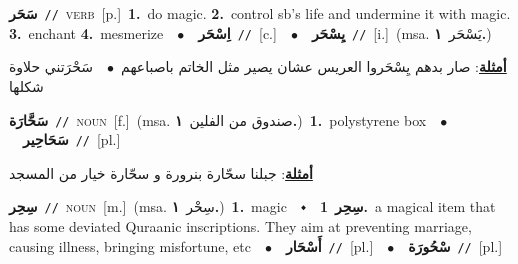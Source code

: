 \documentclass[10pt,a4paper,twoside]{article} %
\begin{document}
\begin{multicols}{2}
{\setlength\topsep{0pt}\textbf{\foreignlanguage{arabic}{سَحَر}}\ {\color{gray}\texttt{//}\color{black}}\ \textsc{verb}\ [p.]\ \textbf{1.}~do magic.  \textbf{2.}~control sb's life and undermine it with magic.  \textbf{3.}~enchant  \textbf{4.}~mesmerize\ \ $\bullet$\ \ \setlength\topsep{0pt}\textbf{\foreignlanguage{arabic}{اِسْحَر}}\ {\color{gray}\texttt{//}\color{black}}\ [c.]\ \ $\bullet$\ \ \setlength\topsep{0pt}\textbf{\foreignlanguage{arabic}{يِسْحَر}}\ {\color{gray}\texttt{//}\color{black}}\ [i.]\ \color{gray}(msa. \foreignlanguage{arabic}{يَسْحَر}~\foreignlanguage{arabic}{\textbf{١.}})\color{black}\  \begin{flushright}\color{gray}\foreignlanguage{arabic}{\textbf{\underline{\foreignlanguage{arabic}{أمثلة}}}: صار بدهم يِسْحَروا العريس عشان يصير مثل الخاتم باصباعهم\ $\bullet$\ \  سَحْرَتني حلاوة شكلها}\end{flushright}\color{black}} \vspace{2mm}

{\setlength\topsep{0pt}\textbf{\foreignlanguage{arabic}{سَحَّارَة}}\ {\color{gray}\texttt{//}\color{black}}\ \textsc{noun}\ [f.]\ \color{gray}(msa. \foreignlanguage{arabic}{صندوق من الفلين}~\foreignlanguage{arabic}{\textbf{١.}})\color{black}\ \textbf{1.}~polystyrene box\ \ $\bullet$\ \ \setlength\topsep{0pt}\textbf{\foreignlanguage{arabic}{سَحَاحِير}}\ {\color{gray}\texttt{//}\color{black}}\ [pl.]\  \begin{flushright}\color{gray}\foreignlanguage{arabic}{\textbf{\underline{\foreignlanguage{arabic}{أمثلة}}}: جبلنا سحّارة بنرورة و سحّارة خيار من المسجد}\end{flushright}\color{black}} \vspace{2mm}

{\setlength\topsep{0pt}\textbf{\foreignlanguage{arabic}{سِحِر}}\ {\color{gray}\texttt{//}\color{black}}\ \textsc{noun}\ [m.]\ \color{gray}(msa. \foreignlanguage{arabic}{سِحْر}~\foreignlanguage{arabic}{\textbf{١.}})\color{black}\ \textbf{1.}~magic\ \ $\smblkdiamond$\ \ \setlength\topsep{0pt}\textbf{\foreignlanguage{arabic}{سِحِر}}\ \textbf{1.}~a magical item that has some deviated Quraanic inscriptions. They aim at preventing marriage, causing illness, bringing misfortune, etc\ \ $\bullet$\ \ \setlength\topsep{0pt}\textbf{\foreignlanguage{arabic}{أَسْحَار}}\ {\color{gray}\texttt{//}\color{black}}\ [pl.]\ \ $\bullet$\ \ \setlength\topsep{0pt}\textbf{\foreignlanguage{arabic}{سْحُورَة}}\ {\color{gray}\texttt{//}\color{black}}\ [pl.]\ } \vspace{2mm}


\end{multicols}
\end{document}
